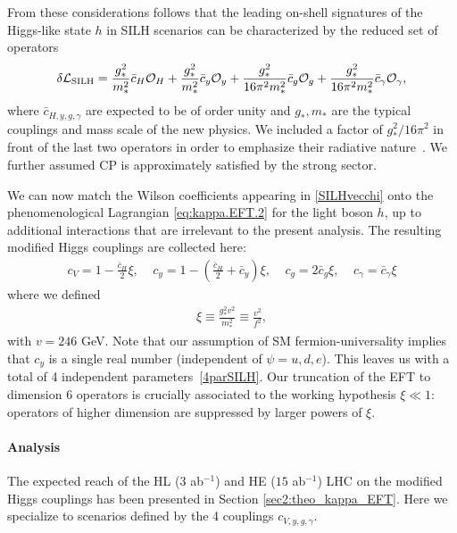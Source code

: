 From these considerations follows that the leading on-shell signatures of the Higgs-like state $h$ in SILH scenarios can be characterized by the reduced set of operators 
\begin{eqnarray}\label{SILHvecchi}
\delta{\cal L}_{\rm SILH}=\frac{g_*^2}{m_*^2}\bar c_H{\cal O}_H+\frac{g_*^2}{m_*^2} \bar c_y{\cal O}_y+\frac{g_*^2}{16\pi^2m_*^2}\bar c_g{\cal O}_g+\frac{g_*^2}{16\pi^2m_*^2}\bar c_\gamma{\cal O}_\gamma,
\end{eqnarray}
where $\bar c_{H,y,g,\gamma}$ are expected to be of order unity and $g_*, m_*$ are the typical couplings and mass scale of the new physics. We included a factor of ${g_*^2}/{16\pi^2}$ in front of the last two operators in order to emphasize their radiative nature~\cite{Giudice:2007fh}. We further assumed CP is approximately satisfied by the strong sector.

We can now match the Wilson coefficients appearing in \eqref{SILHvecchi} onto the phenomenological Lagrangian \eqref{eq:kappa.EFT.2} for the light boson $h$, up to additional interactions that are irrelevant to the present analysis. The resulting modified Higgs couplings are collected here:
\begin{eqnarray}\label{4parSILH}
c_V=1-\frac{\bar c_H}{2}\xi,~~~~~c_y=1-\left(\frac{\bar c_H}{2}+\bar c_y\right)\xi,~~~~~c_g=2 \bar c_g\xi,~~~~~c_\gamma=\bar c_\gamma\xi
\end{eqnarray}
where we defined 
\begin{eqnarray}\label{xi}
\xi\equiv\frac{g_*^2v^2}{m_*^2}\equiv\frac{v^2}{f^2},
\end{eqnarray}
with $v=246$ GeV. Note that our assumption of SM fermion-universality implies that $c_y$ is a single real number (independent of $\psi=u,d,e$). This leaves us with a total of 4 independent parameters~\eqref{4parSILH}. Our truncation of the EFT to dimension 6 operators is crucially associated to the working hypothesis $\xi\ll1$: operators of higher dimension are suppressed by larger powers of $\xi$. 





\paragraph{Analysis}

The expected reach of the HL ($3$ ab$^{-1}$) and HE ($15$ ab$^{-1}$) LHC on the modified Higgs couplings has been presented in Section \ref{sec2:theo_kappa_EFT}. Here we specialize to scenarios defined by the 4 couplings $c_{V,y,g,\gamma}$. 


